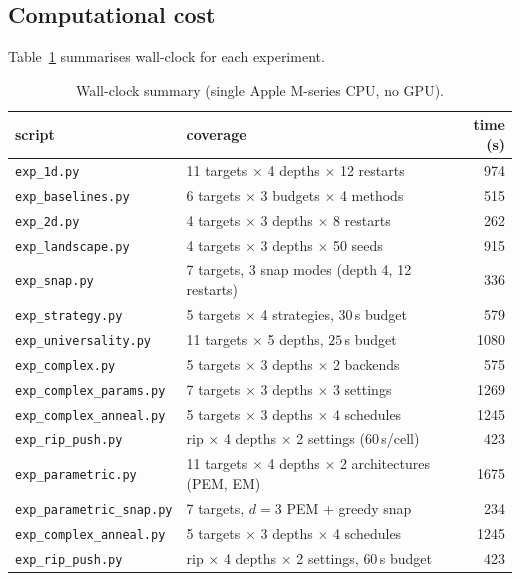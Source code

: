 \documentclass[11pt]{article}
\begin{document}
\subsection{Computational cost}

Table~\ref{tab:cost} summarises wall-clock for each experiment.
\begin{table}[h]
\centering\small
\caption{Wall-clock summary (single Apple M-series CPU, no GPU).}
\label{tab:cost}
\begin{tabular}{llr}
\toprule
script                & coverage                                    & time (s) \\
\midrule
\texttt{exp\_1d.py}        & 11 targets $\times$ 4 depths $\times$ 12 restarts & 974 \\
\texttt{exp\_baselines.py} & 6 targets $\times$ 3 budgets $\times$ 4 methods   & 515 \\
\texttt{exp\_2d.py}        & 4 targets $\times$ 3 depths $\times$ 8 restarts   & 262 \\
\texttt{exp\_landscape.py} & 4 targets $\times$ 3 depths $\times$ 50 seeds     & 915 \\
\texttt{exp\_snap.py}      & 7 targets, 3 snap modes (depth 4, 12 restarts)   & 336 \\
\texttt{exp\_strategy.py}  & 5 targets $\times$ 4 strategies, $30\,$s budget  & 579 \\
\texttt{exp\_universality.py} & 11 targets $\times$ 5 depths, $25\,$s budget  & 1080 \\
\texttt{exp\_complex.py}      & 5 targets $\times$ 3 depths $\times$ 2 backends & 575 \\
\texttt{exp\_complex\_params.py} & 7 targets $\times$ 3 depths $\times$ 3 settings & 1269 \\
\texttt{exp\_complex\_anneal.py} & 5 targets $\times$ 3 depths $\times$ 4 schedules & 1245 \\
\texttt{exp\_rip\_push.py}     & rip $\times$ 4 depths $\times$ 2 settings ($60\,$s/cell)  & 423  \\
\texttt{exp\_parametric.py}   & 11 targets $\times$ 4 depths $\times$ 2 architectures (PEM, EM) & 1675 \\
\texttt{exp\_parametric\_snap.py} & 7 targets, $d{=}3$ PEM + greedy snap   & 234 \\
\texttt{exp\_complex\_anneal.py} & 5 targets $\times$ 3 depths $\times$ 4 schedules & 1245 \\
\texttt{exp\_rip\_push.py}    & rip $\times$ 4 depths $\times$ 2 settings, $60\,$s budget & 423 \\
\bottomrule
\end{tabular}
\end{table}
\end{document}
